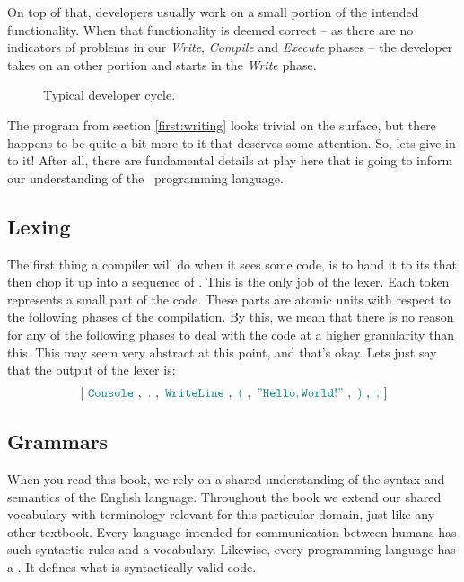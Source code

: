 On top of that, developers usually work on a small portion of the intended functionality. When that functionality is deemed correct -- as there are no indicators of problems in our \textsl{Write}, \textsl{Compile} and \textsl{Execute} phases -- the developer takes on an other portion and starts in the \textsl{Write} phase.

\begin{figure}[tbp]
  
  \caption{Typical developer cycle.}
  \label{fig:first:phases:cycle}
\end{figure}

\csharpsection{\csharp}

The program from section \ref{first:writing} looks trivial on the surface, but there happens to be quite a bit more to it that deserves some attention. So, lets give in to it! After all, there are fundamental details at play here that is going to inform our understanding of the \csharp\ programming language.

\subsection{Lexing}

The first thing a compiler will do when it sees some code, is to hand it to its  that then chop it up into a sequence of . This is the only job of the lexer. Each token represents a small part of the code. These parts are atomic units with respect to the following phases of the compilation. By this, we mean that there is no reason for any of the following phases to deal with the code at a higher granularity than this. This may seem very abstract at this point, and that's okay. Lets just say that the output of the lexer is:
\begin{eqnarray*}
  \left[
    ~ \textcolor{teal}{\mathtt{Console}} ~
    ,
    ~ \textcolor{teal}{\mathtt{.}} ~
    ,
    ~ \textcolor{teal}{\mathtt{WriteLine}} ~
    ,
    ~ \textcolor{teal}{\mathtt{(}} ~
    ,
    ~ \textcolor{teal}{\mathtt{"Hello, World!"}} ~
    ,
    ~ \textcolor{teal}{\mathtt{)}} ~
    ,
    ~ \textcolor{teal}{\mathtt{;}} ~
  \right]
\end{eqnarray*}

\subsection{Grammars}

When you read this book, we rely on a shared understanding of the syntax and semantics of the English language. Throughout the book we extend our shared vocabulary with terminology relevant for this particular domain, just like any other textbook. Every language intended for communication between humans has such syntactic rules and a vocabulary. Likewise, every programming language has a . It defines what is syntactically valid code.

